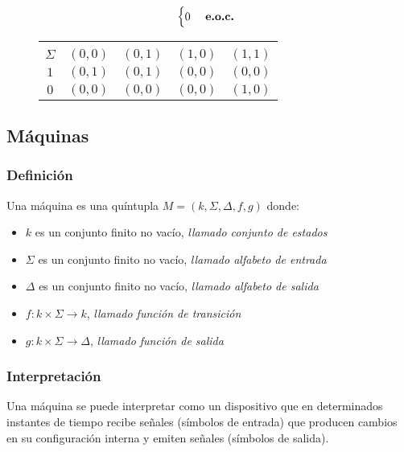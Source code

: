 \begin{itemize}
\begin{align*}
\begin{cases}
0 & \text{ \textbf{e.o.c.} }
\end{cases}
\end{align*}
\begin{figure}[ht!]
\centering
\begin{tabular}{|c|cccc|}
    \hline
    \backslashbox{$k$}{\vspace{0.1pt}\\$\Sigma$} & $(0,0)$ & $(0,1)$ & $(1,0)$ & $(1,1)$ \\ \hline
                $1$ & $(0,1)$ & $(0,1)$ & $(0,0)$  & $(0,0)$  \\ 
                $0$ & $(0,0)$ & $(0,0)$ & $(0,0)$  & $(1,0)$  \\ \hline
\end{tabular} 
\end{figure}
\end{itemize}
\subsection{Máquinas}
\subsubsection{Definición}
Una máquina es una quíntupla $M=(k,\Sigma,\Delta,f,g)$ donde:
\begin{itemize}
\item $k$ es un conjunto finito no vacío, \textit{llamado conjunto de estados}
\item $\Sigma$ es un conjunto finito no vacío, \textit{llamado alfabeto de entrada}
\item $\Delta$ es un conjunto finito no vacío, \textit{llamado alfabeto de salida}
\item $f:k\times\Sigma\rightarrow k$, \textit{llamado función de transición}
\item $g:k\times\Sigma\rightarrow \Delta$, \textit{llamado función de salida}
\end{itemize}
\subsubsection{Interpretación}
Una máquina se puede interpretar como un dispositivo que en determinados instantes de tiempo recibe señales (símbolos de entrada) que producen cambios en su configuración interna y emiten señales (símbolos de salida).
\begin{center}
\end{center}
